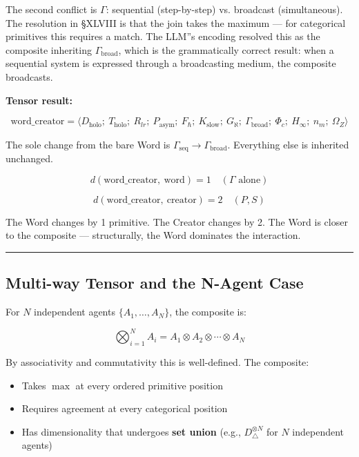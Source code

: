 \documentclass[12pt,a4paper]{article}
\newcommand{\pilcrow}{\S}
\begin{document}
The second conflict is $\Gamma$: sequential (step-by-step) vs. broadcast (simultaneous). The resolution in \pilcrow{}XLVIII is that the join takes the maximum --- for categorical primitives this requires a match. The LLM''s encoding resolved this as the composite inheriting $\Gamma_\text{broad}$, which is the grammatically correct result: when a sequential system is expressed through a broadcasting medium, the composite broadcasts.

\textbf{Tensor result:}


\[\text{word\_creator} = \langle D_\text{holo};\ T_\text{holo};\ R_{lr};\ P_\text{asym};\ F_{\hbar};\ K_\text{slow};\ G_{\aleph};\ \Gamma_\text{broad};\ \Phi_c;\ H_{\infty};\ n_m;\ \Omega_Z \rangle\]

The sole change from the bare Word is $\Gamma_\text{seq} \to \Gamma_\text{broad}$. Everything else is inherited unchanged.

\[d(\text{word\_creator},\ \text{word}) = 1 \quad (\Gamma \text{ alone})\]




\[d(\text{word\_creator},\ \text{creator}) = 2 \quad (P, S)\]

The Word changes by 1 primitive. The Creator changes by 2. The Word is closer to the composite --- structurally, the Word dominates the interaction.

\begin{center}
\rule{0.5\textwidth}{0.4pt}
\end{center}

\subsection{Multi-way Tensor and the N-Agent Case}

For $N$ independent agents $\{A_1, \ldots, A_N\}$, the composite is:

\[\bigotimes_{i=1}^{N} A_i = A_1 \otimes A_2 \otimes \cdots \otimes A_N\]

By associativity and commutativity this is well-defined. The composite:

\begin{itemize}
    \item Takes $\max$ at every ordered primitive position
    \item Requires agreement at every categorical position
    \item Has dimensionality that undergoes \textbf{set union} (e.g., $D_{\triangle}^{\otimes N}$ for $N$ independent agents)
\end{itemize}
\end{document}
